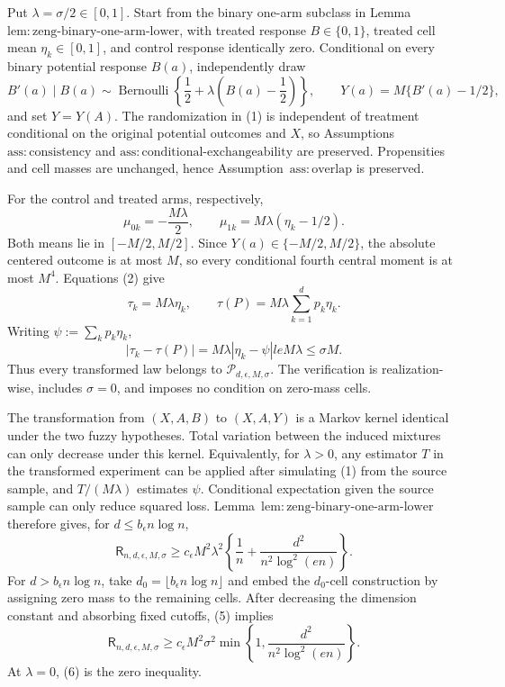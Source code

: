 Put \(\lambda=\sigma/2\in[0,1]\).  Start from the binary one-arm subclass in Lemma~\(\mathrm{lem:zeng\text{-}binary\text{-}one\text{-}arm\text{-}lower}\), with treated response \(B\in\{0,1\}\), treated cell mean \(\eta_k\in[0,1]\), and control response identically zero.  Conditional on every binary potential response \(B(a)\), independently draw
\[
 B'(a)\mid B(a)\sim\operatorname{Bernoulli}\!\left\{\frac12+\lambda\left(B(a)-\frac12\right)\right\},
 \qquad Y(a)=M\{B'(a)-1/2\},
\tag{1}
\]
and set \(Y=Y(A)\).  The randomization in (1) is independent of treatment conditional on the original potential outcomes and \(X\), so Assumptions~\(\mathrm{ass:consistency}\) and \(\mathrm{ass:conditional\text{-}exchangeability}\) are preserved.  Propensities and cell masses are unchanged, hence Assumption~\(\mathrm{ass:overlap}\) is preserved.

For the control and treated arms, respectively,
\[
 \mu_{0k}=-\frac{M\lambda}{2},
 \qquad
 \mu_{1k}=M\lambda(\eta_k-1/2).
\tag{2}
\]
Both means lie in \([-M/2,M/2]\).  Since \(Y(a)\in\{-M/2,M/2\}\), the absolute centered outcome is at most \(M\), so every conditional fourth central moment is at most \(M^4\).  Equations (2) give
\[
 \tau_k=M\lambda\eta_k,
 \qquad
 \tau(P)=M\lambda\sum_{k=1}^dp_k\eta_k.
\tag{3}
\]
Writing \(\psi:=\sum_kp_k\eta_k\),
\[
 |\tau_k-\tau(P)|=M\lambda|\eta_k-\psi|le M\lambda\le\sigma M.
\tag{4}
\]
Thus every transformed law belongs to \(\mathcal P_{d,\epsilon,M,\sigma}\).  The verification is realization-wise, includes \(\sigma=0\), and imposes no condition on zero-mass cells.

The transformation from \((X,A,B)\) to \((X,A,Y)\) is a Markov kernel identical under the two fuzzy hypotheses.  Total variation between the induced mixtures can only decrease under this kernel.  Equivalently, for \(\lambda>0\), any estimator \(T\) in the transformed experiment can be applied after simulating (1) from the source sample, and \(T/(M\lambda)\) estimates \(\psi\).  Conditional expectation given the source sample can only reduce squared loss.  Lemma~\(\mathrm{lem:zeng\text{-}binary\text{-}one\text{-}arm\text{-}lower}\) therefore gives, for \(d\le b_{\epsilon}n\log n\),
\[
 \mathsf R_{n,d,\epsilon,M,\sigma}
 \ge c_{\epsilon}M^2\lambda^2\left\{\frac1n+\frac{d^2}{n^2\log^2(en)}\right\}.
\tag{5}
\]
For \(d>b_{\epsilon}n\log n\), take \(d_0=\lfloor b_{\epsilon}n\log n\rfloor\) and embed the \(d_0\)-cell construction by assigning zero mass to the remaining cells.  After decreasing the dimension constant and absorbing fixed cutoffs, (5) implies
\[
 \mathsf R_{n,d,\epsilon,M,\sigma}
 \ge c_{\epsilon}M^2\sigma^2
 \min\left\{1,\frac{d^2}{n^2\log^2(en)}\right\}.
\tag{6}
\]
At \(\lambda=0\), (6) is the zero inequality.

